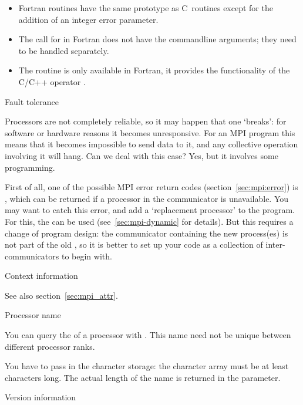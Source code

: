 \begin{itemize}
\item Fortran routines have the same prototype as C~routines except for the addition
  of an integer error parameter.
\item The call for
   in Fortran
  does not have the commandline arguments;
  they need to be handled separately.
\item The routine  is only available in Fortran, it provides the 
  functionality of the C/C++ operator .
\end{itemize}


 {Fault tolerance}
\label{mpi:tolerant}

Processors are not completely reliable, so it may happen that one
`breaks': for software or hardware reasons it becomes
unresponsive. For an MPI program this means that it becomes impossible
to send data to it, and any collective operation involving it will
hang. Can we deal with this case? Yes, but it involves some
programming.

First of all, one of the possible MPI error return codes
(section~\ref{sec:mpi:error}) is , which can be returned
if a processor in the communicator is unavailable. You may want to
catch this error, and add a `replacement processor' to the
program. For this, the  can be used
(see~\ref{sec:mpi-dynamic} for details).
%
But this requires a change of program design: the communicator
containing the new process(es) is not part of the
old , so it is better to set up your code as a
collection of inter-communicators to begin with.

 {Context information}
\label{sec:context}

See also section~\ref{sec:mpi_attr}.

 {Processor name}

You can query the  of a processor with
.
This name need not be unique between different processor ranks.

You have to pass in the character storage:
the character array must be at least  characters long.
The actual length of the name is returned in the  parameter.

 {Version information}

